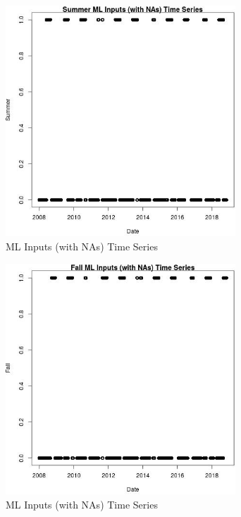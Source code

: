 \begin{figure} 
\centering  
\includegraphics[width=0.77\textwidth]{Code_Outputs/Report_ML_input_PM25_Step4_part_e_de_duplicated_aves_compiled_2019-05-20wNAs_SummervDate.jpg} 
\caption{\label{fig:Report_ML_input_PM25_Step4_part_e_de_duplicated_aves_compiled_2019-05-20wNAsSummervDate}ML Inputs (with NAs) Time Series} 
\end{figure} 
 

\begin{figure} 
\centering  
\includegraphics[width=0.77\textwidth]{Code_Outputs/Report_ML_input_PM25_Step4_part_e_de_duplicated_aves_compiled_2019-05-20wNAs_FallvDate.jpg} 
\caption{\label{fig:Report_ML_input_PM25_Step4_part_e_de_duplicated_aves_compiled_2019-05-20wNAsFallvDate}ML Inputs (with NAs) Time Series} 
\end{figure} 
 
